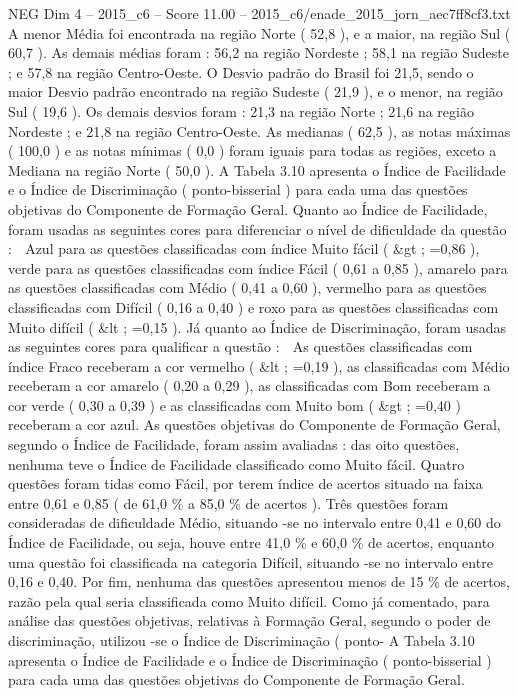 \begin{textsample}{NEG Dim 4 – 2015\_c6 – Score 11.00 – 2015\_c6/enade\_2015\_jorn\_aec7ff8cf3.txt}
A menor Média foi encontrada na região Norte ( 52,8 ), e a maior, na região Sul ( 60,7 ).
As demais médias foram : 56,2 na região Nordeste ; 58,1 na região Sudeste ; e 57,8 na região Centro-Oeste.
O Desvio padrão do Brasil foi 21,5, sendo o maior Desvio padrão encontrado na região Sudeste ( 21,9 ), e o menor, na região Sul ( 19,6 ).
Os demais desvios foram : 21,3 na região Norte ; 21,6 na região Nordeste ; e 21,8 na região Centro-Oeste.
As medianas ( 62,5 ), as notas máximas ( 100,0 ) e as notas mínimas ( 0,0 ) foram iguais para todas as regiões, exceto a Mediana na região Norte ( 50,0 ).
A Tabela 3.10 apresenta o Índice de Facilidade e o Índice de Discriminação ( ponto-bisserial ) para cada uma das questões objetivas do Componente de Formação Geral.
Quanto ao Índice de Facilidade, foram usadas as seguintes cores para diferenciar o nível de dificuldade da questão :  Azul para as questões classificadas com índice Muito fácil ( \&gt ; =0,86 ), verde para as questões classificadas com índice Fácil ( 0,61 a 0,85 ), amarelo para as questões classificadas com Médio ( 0,41 a 0,60 ), vermelho para as questões classificadas com Difícil ( 0,16 a 0,40 ) e roxo para as questões classificadas com Muito difícil ( \&lt ; =0,15 ).
Já quanto ao Índice de Discriminação, foram usadas as seguintes cores para qualificar a questão :  As questões classificadas com índice Fraco receberam a cor vermelho ( \&lt ; =0,19 ), as classificadas com Médio receberam a cor amarelo ( 0,20 a 0,29 ), as classificadas com Bom receberam a cor verde ( 0,30 a 0,39 ) e as classificadas com Muito bom ( \&gt ; =0,40 ) receberam a cor azul.
As questões objetivas do Componente de Formação Geral, segundo o Índice de Facilidade, foram assim avaliadas : das oito questões, nenhuma teve o Índice de Facilidade classificado como Muito fácil.
Quatro questões foram tidas como Fácil, por terem índice de acertos situado na faixa entre 0,61 e 0,85 ( de 61,0 \% a 85,0 \% de acertos ).
Três questões foram consideradas de dificuldade Médio, situando -se no intervalo entre 0,41 e 0,60 do Índice de Facilidade, ou seja, houve entre 41,0 \% e 60,0 \% de acertos, enquanto uma questão foi classificada na categoria Difícil, situando -se no intervalo entre 0,16 e 0,40.
Por fim, nenhuma das questões apresentou menos de 15 \% de acertos, razão pela qual seria classificada como Muito difícil.
Como já comentado, para análise das questões objetivas, relativas à Formação Geral, segundo o poder de discriminação, utilizou -se o Índice de Discriminação ( ponto- A Tabela 3.10 apresenta o Índice de Facilidade e o Índice de Discriminação ( ponto-bisserial ) para cada uma das questões objetivas do Componente de Formação Geral.

\end{textsample}
